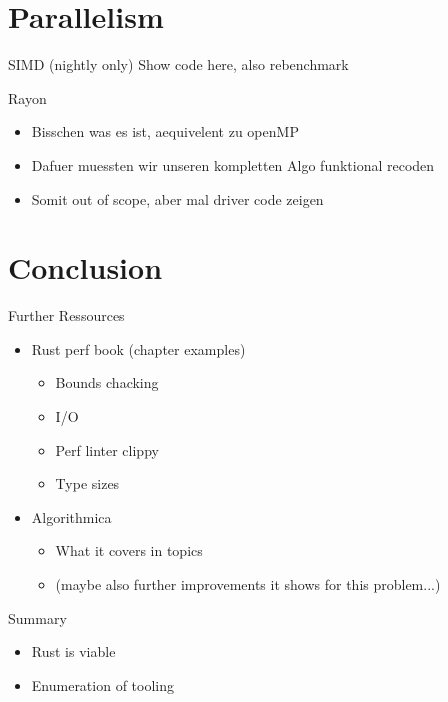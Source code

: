 \documentclass[compress,aspectratio=169]{beamer}
\begin{document}
\section{Parallelism}
\begin{frame}{SIMD (nightly only)}
  Show code here, also rebenchmark
\end{frame}

\begin{frame}{Rayon}
  \begin{itemize}
    \item Bisschen was es ist, aequivelent zu openMP
    \item Dafuer muessten wir unseren kompletten Algo funktional recoden
    \item Somit out of scope, aber mal driver code zeigen
  \end{itemize}
\end{frame}


\section{Conclusion}
\begin{frame}{Further Ressources}
  \begin{itemize}
    \item Rust perf book (chapter examples)
      \begin{itemize}
        \item Bounds chacking
        \item I/O
        \item Perf linter clippy
        \item Type sizes
      \end{itemize}
    \item Algorithmica
      \begin{itemize}
        \item What it covers in topics
        \item (maybe also further improvements it shows for this problem...)
      \end{itemize}
  \end{itemize}
\end{frame}

\begin{frame}{Summary}
\label{pg:lastpage} %
  \begin{itemize}
    \item Rust is viable
    \item Enumeration of tooling
  \end{itemize}
\end{frame}
\end{document}
